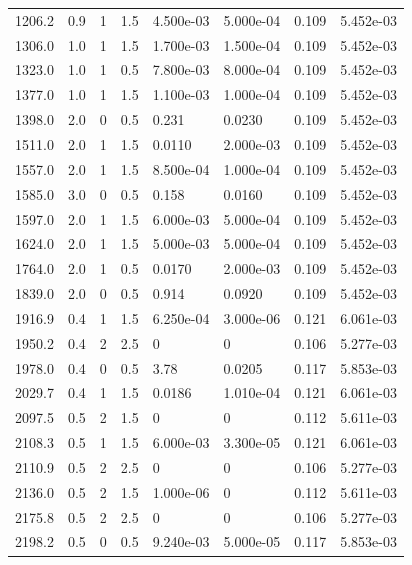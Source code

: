 \documentclass[preview]{standalone}
\begin{document}
{{\begin{tabular}{L{1.2cm}C{1.2cm} C{0.3cm}C{0.5cm} C{1.4cm}C{1.4cm} C{1.4cm}C{1.4cm}}
  1206.2  &   0.9  & 1     & 1.5 &  4.500e-03  & 5.000e-04  & 0.109 &  5.452e-03   \\ 
  1306.0  &   1.0  & 1     & 1.5 &  1.700e-03  & 1.500e-04  & 0.109 &  5.452e-03   \\ 
  1323.0  &   1.0  & 1     & 0.5 &  7.800e-03  & 8.000e-04  & 0.109 &  5.452e-03   \\ 
  1377.0  &   1.0  & 1     & 1.5 &  1.100e-03  & 1.000e-04  & 0.109 &  5.452e-03   \\ 
  1398.0  &   2.0  & 0     & 0.5 &  0.231  & 0.0230  & 0.109 &  5.452e-03   \\ 
  1511.0  &   2.0  & 1     & 1.5 &  0.0110  & 2.000e-03  & 0.109 &  5.452e-03   \\ 
  1557.0  &   2.0  & 1     & 1.5 &  8.500e-04  & 1.000e-04  & 0.109 &  5.452e-03   \\ 
  1585.0  &   3.0  & 0     & 0.5 &  0.158  & 0.0160  & 0.109 &  5.452e-03   \\ 
  1597.0  &   2.0  & 1     & 1.5 &  6.000e-03  & 5.000e-04  & 0.109 &  5.452e-03   \\ 
  1624.0  &   2.0  & 1     & 1.5 &  5.000e-03  & 5.000e-04  & 0.109 &  5.452e-03   \\ 
  1764.0  &   2.0  & 1     & 0.5 &  0.0170  & 2.000e-03  & 0.109 &  5.452e-03   \\ 
  1839.0  &   2.0  & 0     & 0.5 &  0.914  & 0.0920  & 0.109 &  5.452e-03   \\ 
  1916.9  &   0.4  & 1     & 1.5 &  6.250e-04  & 3.000e-06  & 0.121 &  6.061e-03   \\ 
  1950.2  &   0.4  & 2     & 2.5 &  0  & 0  & 0.106 &  5.277e-03   \\ 
  1978.0  &   0.4  & 0     & 0.5 &  3.78  & 0.0205  & 0.117 &  5.853e-03   \\ 
  2029.7  &   0.4  & 1     & 1.5 &  0.0186  & 1.010e-04  & 0.121 &  6.061e-03   \\ 
  2097.5  &   0.5  & 2     & 1.5 &  0  & 0  & 0.112 &  5.611e-03   \\ 
  2108.3  &   0.5  & 1     & 1.5 &  6.000e-03  & 3.300e-05  & 0.121 &  6.061e-03   \\ 
  2110.9  &   0.5  & 2     & 2.5 &  0  & 0  & 0.106 &  5.277e-03   \\ 
  2136.0  &   0.5  & 2     & 1.5 &  1.000e-06  & 0  & 0.112 &  5.611e-03   \\ 
  2175.8  &   0.5  & 2     & 2.5 &  0  & 0  & 0.106 &  5.277e-03   \\ 
  2198.2  &   0.5  & 0     & 0.5 &  9.240e-03  & 5.000e-05  & 0.117 &  5.853e-03   \\ 

\end{tabular}}}
\end{document}
